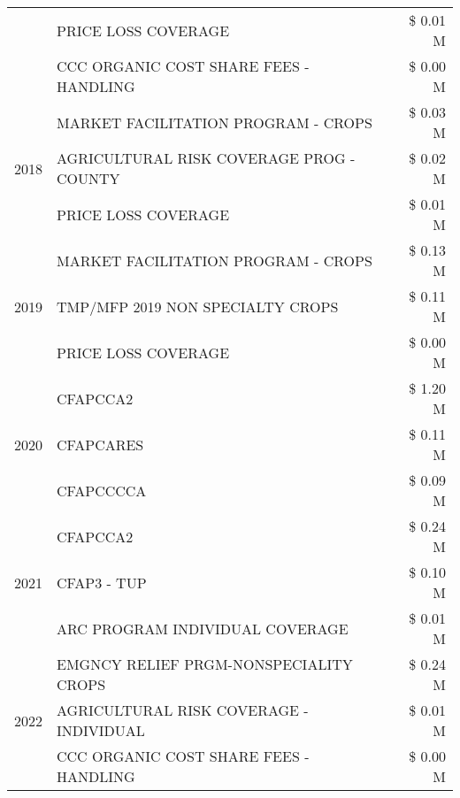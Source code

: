 \begin{tabular}{llr}
 & PRICE LOSS COVERAGE & \$ 0.01 M \\
 & CCC ORGANIC COST SHARE FEES - HANDLING & \$ 0.00 M \\
\cline{1-3}
\multirow[t]{3}{*}{2018} & MARKET FACILITATION PROGRAM - CROPS & \$ 0.03 M \\
 & AGRICULTURAL RISK COVERAGE PROG - COUNTY & \$ 0.02 M \\
 & PRICE LOSS COVERAGE & \$ 0.01 M \\
\cline{1-3}
\multirow[t]{3}{*}{2019} & MARKET FACILITATION PROGRAM - CROPS & \$ 0.13 M \\
 & TMP/MFP 2019 NON SPECIALTY CROPS & \$ 0.11 M \\
 & PRICE LOSS COVERAGE & \$ 0.00 M \\
\cline{1-3}
\multirow[t]{3}{*}{2020} & CFAPCCA2 & \$ 1.20 M \\
 & CFAPCARES & \$ 0.11 M \\
 & CFAPCCCCA & \$ 0.09 M \\
\cline{1-3}
\multirow[t]{3}{*}{2021} & CFAPCCA2 & \$ 0.24 M \\
 & CFAP3 - TUP & \$ 0.10 M \\
 & ARC PROGRAM INDIVIDUAL COVERAGE & \$ 0.01 M \\
\cline{1-3}
\multirow[t]{3}{*}{2022} & EMGNCY RELIEF PRGM-NONSPECIALITY CROPS & \$ 0.24 M \\
 & AGRICULTURAL RISK COVERAGE - INDIVIDUAL & \$ 0.01 M \\
 & CCC ORGANIC COST SHARE FEES - HANDLING & \$ 0.00 M \\
\cline{1-3}
\bottomrule
\end{tabular}
